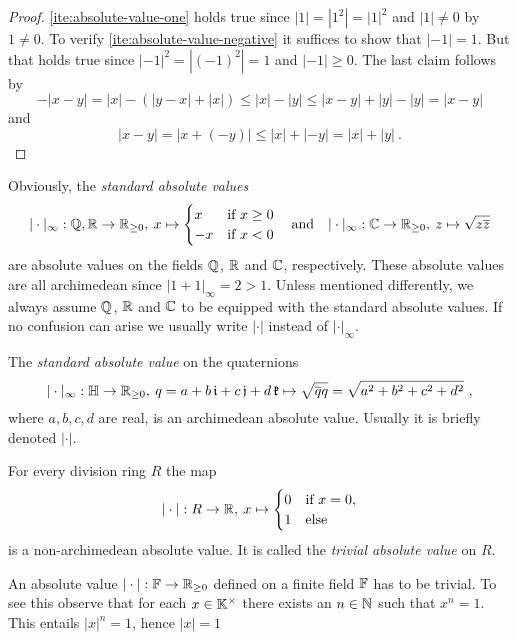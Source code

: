 \begin{proof}
  \ref{ite:absolute-value-one} holds true since $|1| = |1^2| = |1|^2$ and $|1| \neq 0$ by $1 \neq 0$.
  To verify \ref{ite:absolute-value-negative} it suffices to show that $|-1| =1$. But that holds true
  since $|-1|^2 = | (-1)^2| = 1$ and $|-1| \geq 0$.
  The last claim follows by
  \[
  - |x-y| = |x| - (|y-x| +|x|) \leq |x| - |y| \leq  |x-y| + |y | - |y| = |x-y| 
  \]
  and
  \[
    |x - y|  = | x + (-y)|  \leq  |x| + |-y| = |x| + |y| \ .
  \]
\end{proof}

\begin{examples}
\begin{environmentlist}
\item
  Obviously, the \emph{standard absolute values}
  \[ 
    |\cdot |_\infty : \mathbb{Q}, \mathbb{R}\to \mathbb{R}_{\geq 0}, \: x \mapsto
    \begin{cases}
      x & \text{if } x\geq 0\\
      -x & \text{if } x< 0
    \end{cases}
  \quad\text{and}\quad
    |\cdot |_\infty : \mathbb{C}\to \mathbb{R}_{\geq 0}, \: z \mapsto \sqrt{z \overline{z}}
  \]
  are absolute values on the fields $\mathbb{Q}$, $\mathbb{R}$ and $\mathbb{C}$, respectively. These absolute values are all archimedean
  since $|1+ 1|_\infty = 2 > 1$. Unless mentioned differently, we always assume 
  $\mathbb{Q}$, $\mathbb{R}$ and $\mathbb{C}$ to be equipped with the standard absolute values. If no confusion can arise we usually
  write $|\cdot|$ instead of $|\cdot |_\infty$.
\item
  The \emph{standard absolute value} on the quaternions
  \[
     |\cdot |_\infty : \mathbb{H} \to \mathbb{R}_{\geq 0} , \: q = a + b \,\mathfrak{i} + c\,\mathfrak{j} + d \,\mathfrak{k} \mapsto \sqrt{\overline{q}q} = \sqrt{a^2 +b^2+ c^2 + d^2} \ , 
  \]
  where $a,b,c,d$ are real, is an archimedean absolute value. Usually it is briefly denoted $|\cdot|$.   
\item 
  For every division ring $R$ the map 
  \[ |\cdot| :R \to \mathbb{R}, \: x \mapsto
    \begin{cases}
    0 & \text{if } x=0 ,\\
    1 & \text{else} 
  \end{cases}
  \]
  is a non-archimedean absolute value. It is called the \emph{trivial absolute value} on $R$.
\item
  An absolute value  $|\cdot|:\mathbb{F} \to\mathbb{R}_{\geq 0}$ defined on a finite field $\mathbb{F}$ has to be trivial.
  To see this observe that for each $x\in \mathbb{K}^\times$ there
  exists an $n\in \mathbb{N}$ such that $x^n =1$. This entails  $|x|^n=1$, hence $|x|=1$

\end{environmentlist}
\end{examples}
